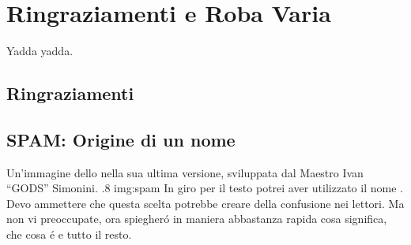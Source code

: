 \chapter*{Ringraziamenti e Roba Varia}
\label{chap:Thanks}

Yadda yadda.

\section*{Ringraziamenti}

\section*{SPAM: Origine di un nome}
        {Un'immagine dello \SPAM{} nella sua ultima versione,
            sviluppata dal Maestro Ivan ``GODS'' Simonini.}
        {.8}
        {img:spam}
In giro per il testo potrei aver utilizzato il nome \SPAM{}. Devo ammettere
che questa scelta potrebbe creare della confusione nei lettori. Ma non vi
preoccupate, ora spiegher\'o in maniera abbastanza rapida cosa significa,
che cosa \'e e tutto il resto.

\cleardoublepage
